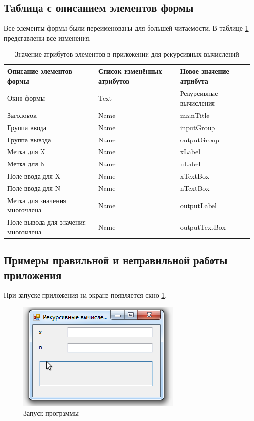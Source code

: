 \subsection{Таблица с описанием элементов формы}
Все элементы формы были переименованы для большей читаемости. В таблице \ref{tab:recursive-calculations-form} представлены все изменения.

\begin{table}
\centering
\begin{tabular}{|m{}|m{}|m{}|}
\hline
\textbf{Описание элементов формы} & \textbf{Список изменённых атрибутов} & \textbf{Новое значение атрибута} \\
\hline
\hline
Окно формы & Text & Рекурсивные вычисления \\
Заголовок & Name & mainTitle \\
Группа ввода & Name & inputGroup \\
Группа вывода & Name & outputGroup \\
Метка для X & Name & xLabel \\
Метка для N & Name & nLabel \\
Поле ввода для X & Name & xTextBox \\
Поле ввода для N & Name & nTextBox \\
Метка для значения многочлена & Name & outputLabel \\
Поле вывода для значения многочлена & Name & outputTextBox \\
\hline
\end{tabular}
\caption{Значение атрибутов элементов в приложении для рекурсивных вычислений}
\label{tab:recursive-calculations-form}
\end{table}

\subsection{Примеры правильной и неправильной работы приложения}
При запуске приложения на экране появляется окно \ref{fig:recursive-calculations-start}.

\begin{figure}
\centering
\includegraphics[width=0.5\linewidth]{images//recursive-calculations/start.png}
\caption{Запуск программы}
\label{fig:recursive-calculations-start}
\end{figure}

